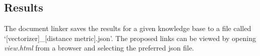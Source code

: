 \subsection{Results}
The document linker saves the results for a given knowledge base to a file called `[vectorizer]\_[distance metric].json'. The proposed links can be viewed by opening \emph{view.html} from a browser and selecting the preferred json file.  %
